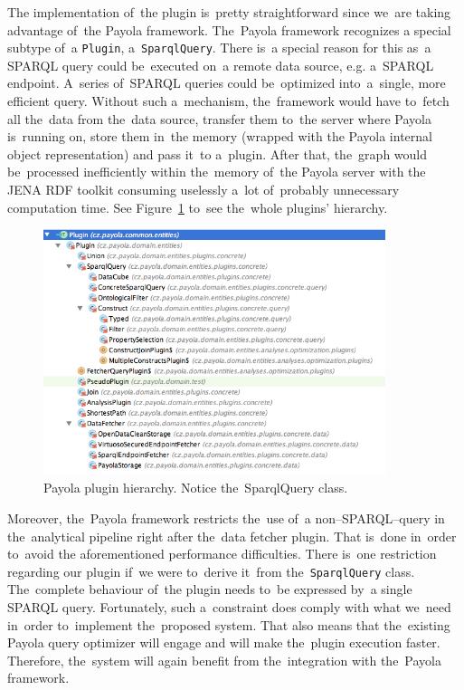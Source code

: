 The implementation of~the plugin is~pretty straightforward since we~are 
taking advantage of~the Payola framework. The~Payola framework recognizes a
special subtype of~a \texttt{Plugin}, a~\texttt{SparqlQuery}. There is~a special 
reason for this as~a SPARQL query could be~executed on~a remote data source, 
e.g. a~SPARQL endpoint. A~series of~SPARQL queries could be~optimized into~a~single, more efficient query. Without such a~mechanism, the~framework would
have to~fetch all the~data from the~data source, transfer them to~the server 
where Payola is~running on, store them in~the memory (wrapped with
the Payola internal object representation) and pass it~to a~plugin. After that, the~graph would be~processed inefficiently within the~memory of~the Payola server with 
the JENA RDF toolkit consuming uselessly a~lot of~probably unnecessary computation time. See 
Figure~\ref{fig:plugin-hierarchy} to~see the~whole plugins’ hierarchy.


\begin{figure}
	\centering
	\includegraphics[width=100mm]{img/plugin-hierarchy.png}
	\caption{Payola plugin hierarchy. Notice the~SparqlQuery class.}
	\label{fig:plugin-hierarchy}
\end{figure}

Moreover, the~Payola framework restricts the~use of~a non--SPARQL--query 
in the~analytical pipeline right after the~data fetcher plugin. That is~done in~order to~avoid 
the aforementioned performance difficulties. There is~one restriction regarding our plugin if~we
were to~derive it~from the~\texttt{SparqlQuery} class. The~complete behaviour of~the plugin needs to~be expressed by~a single SPARQL query. Fortunately, such a~constraint does 
comply with what we~need in~order to~implement the~proposed system. That also means
that the~existing Payola query optimizer will engage and 
will make the~plugin execution faster. Therefore, the~system will again 
benefit from the~integration with the~Payola framework.

